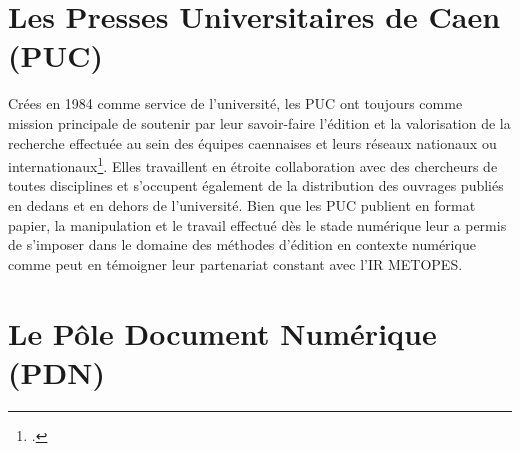 \documentclass[a4paper,12pt,twoside]{book}
\begin{document}
    \section{Les Presses Universitaires de Caen (PUC)}
    
    Crées en 1984 comme service de l'université, les \acrshort{PUC} ont toujours comme mission principale de \og soutenir par leur savoir-faire l'édition et la valorisation de la recherche effectuée au sein des équipes caennaises et leurs réseaux nationaux ou internationaux\fg\footcite{PUC}. Elles travaillent en étroite collaboration avec des chercheurs de toutes disciplines et s'occupent également de la distribution des ouvrages publiés en dedans et en dehors de l'université. Bien que les \acrshort{PUC} publient en format papier, la manipulation et le travail effectué dès le stade numérique leur a permis de s'imposer dans le domaine des méthodes d'édition en contexte numérique comme peut en témoigner leur partenariat constant avec l'IR \acrshort{METOPES}.

    \section{Le Pôle Document Numérique (PDN)}
    
\end{document}
